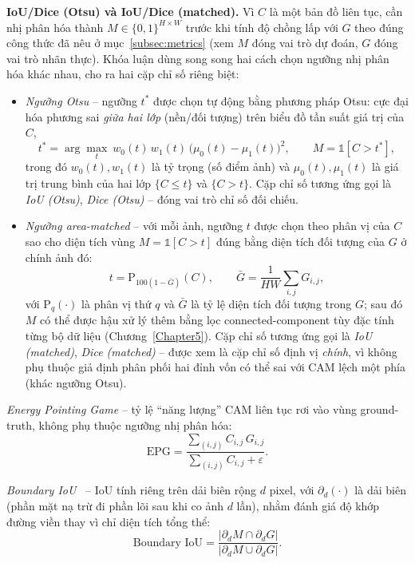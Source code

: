 \textbf{IoU/Dice (Otsu) và IoU/Dice (matched).} Vì $C$ là một bản đồ liên tục, cần nhị phân hóa thành $M \in \{0,1\}^{H\times W}$ trước khi tính độ chồng lấp với $G$ theo đúng công thức đã nêu ở mục~\ref{subsec:metrics} (xem $M$ đóng vai trò dự đoán, $G$ đóng vai trò nhãn thực). Khóa luận dùng song song hai cách chọn ngưỡng nhị phân hóa khác nhau, cho ra hai cặp chỉ số riêng biệt:
\begin{itemize}
    \item \emph{Ngưỡng Otsu} -- ngưỡng $t^{*}$ được chọn tự động bằng phương pháp Otsu: cực đại hóa phương sai \emph{giữa hai lớp} (nền/đối tượng) trên biểu đồ tần suất giá trị của $C$,
    \begin{equation}
        t^{*} = \arg\max_{t}\ w_0(t)\,w_1(t)\,\big(\mu_0(t)-\mu_1(t)\big)^2, \qquad M = \mathbb{1}[C > t^{*}],
    \end{equation}
    trong đó $w_0(t), w_1(t)$ là tỷ trọng (số điểm ảnh) và $\mu_0(t), \mu_1(t)$ là giá trị trung bình của hai lớp $\{C \le t\}$ và $\{C > t\}$. Cặp chỉ số tương ứng gọi là \emph{IoU (Otsu)}, \emph{Dice (Otsu)} -- đóng vai trò chỉ số đối chiếu.
    \item \emph{Ngưỡng area-matched} -- với mỗi ảnh, ngưỡng $t$ được chọn theo phân vị của $C$ sao cho diện tích vùng $M=\mathbb{1}[C>t]$ đúng bằng diện tích đối tượng của $G$ ở chính ảnh đó:
    \begin{equation}
        t = \mathrm{P}_{100(1-\bar{G})}(C), \qquad \bar{G} = \frac{1}{HW}\sum_{i,j} G_{i,j},
    \end{equation}
    với $\mathrm{P}_q(\cdot)$ là phân vị thứ $q$ và $\bar{G}$ là tỷ lệ diện tích đối tượng trong $G$; sau đó $M$ có thể được hậu xử lý thêm bằng lọc connected-component tùy đặc tính từng bộ dữ liệu (Chương~\ref{Chapter5}). Cặp chỉ số tương ứng gọi là \emph{IoU (matched)}, \emph{Dice (matched)} -- được xem là cặp chỉ số định vị \emph{chính}, vì không phụ thuộc giả định phân phối hai đỉnh vốn có thể sai với CAM lệch một phía (khác ngưỡng Otsu).
\end{itemize}

\emph{Energy Pointing Game} -- tỷ lệ ``năng lượng'' CAM liên tục rơi vào vùng ground-truth, không phụ thuộc ngưỡng nhị phân hóa:
\begin{equation}
    \text{EPG} = \frac{\sum_{(i,j)} C_{i,j}\, G_{i,j}}{\sum_{(i,j)} C_{i,j} + \varepsilon}.
\end{equation}

\emph{Boundary IoU}~\cite{cheng2021boundaryiou} -- IoU tính riêng trên dải biên rộng $d$ pixel, với $\partial_d(\cdot)$ là dải biên (phần mặt nạ trừ đi phần lõi sau khi co ảnh $d$ lần), nhằm đánh giá độ khớp đường viền thay vì chỉ diện tích tổng thể:
\begin{equation}
    \text{Boundary IoU} = \frac{\lvert \partial_d M \cap \partial_d G \rvert}{\lvert \partial_d M \cup \partial_d G \rvert}.
\end{equation}

